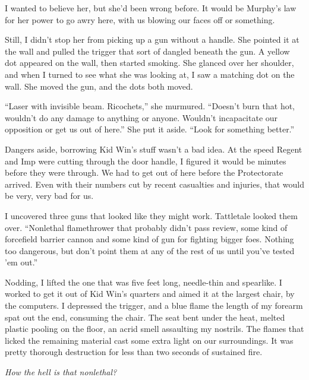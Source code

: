 I wanted to believe her, but she'd been wrong before.  It would be Murphy's law for her power to go awry here, with us blowing our faces off or something.



Still, I didn't stop her from picking up a gun without a handle.  She pointed it at the wall and pulled the trigger that sort of dangled beneath the gun.  A yellow dot appeared on the wall, then started smoking.  She glanced over her shoulder, and when I turned to see what she was looking at, I saw a matching dot on the wall.  She moved the gun, and the dots both moved.



``Laser with invisible beam.  Ricochets,'' she murmured.  ``Doesn't burn that hot, wouldn't do any damage to anything or anyone.  Wouldn't incapacitate our opposition or get us out of here.''  She put it aside.  ``Look for something better.''



Dangers aside, borrowing Kid Win's stuff wasn't a bad idea.  At the speed Regent and Imp were cutting through the door handle, I figured it would be minutes before they were through.  We had to get out of here before the Protectorate arrived.  Even with their numbers cut by recent casualties and injuries, that would be very, very bad for us.



I uncovered three guns that looked like they might work.  Tattletale looked them over.  ``Nonlethal flamethrower that probably didn't pass review, some kind of forcefield barrier cannon and some kind of gun for fighting bigger foes.  Nothing too dangerous, but don't point them at any of the rest of us until you've tested 'em out.''



Nodding, I lifted the one that was five feet long, needle-thin and spearlike.  I worked to get it out of Kid Win's quarters and aimed it at the largest chair, by the computers.  I depressed the trigger, and a blue flame the length of my forearm spat out the end, consuming the chair.  The seat bent under the heat, melted plastic pooling on the floor, an acrid smell assaulting my nostrils.  The flames that licked the remaining material cast some extra light on our surroundings.  It was pretty thorough destruction for less than two seconds of sustained fire.



\emph{How the hell is that nonlethal?}



